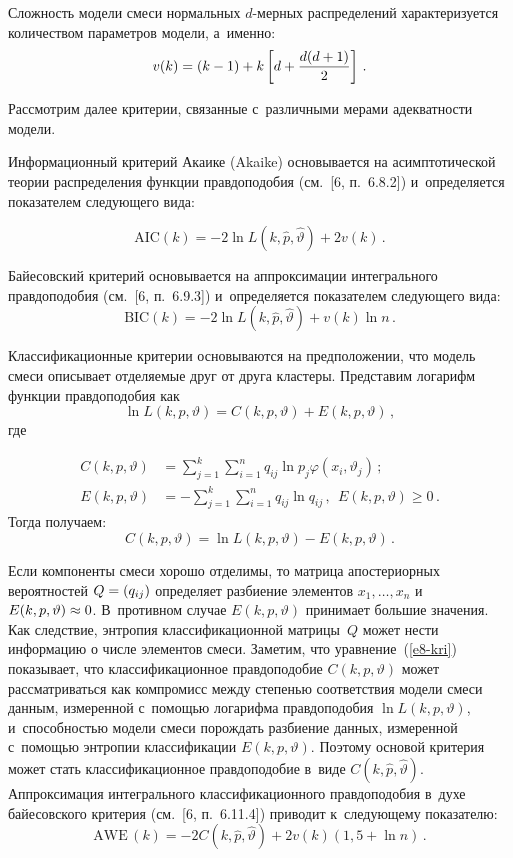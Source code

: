 \begin{multicols}{2}
     Сложность модели смеси нормальных $d$-мер\-ных распределений
характеризуется количеством параметров модели, а~именно:
     $$
     v(k) =(k-1)+k\left[ d+\displaystyle\frac{\displaystyle d(d+1)\mathstrut}{\displaystyle 2\mathstrut}\right]\,.
     $$

     Рассмотрим далее критерии, связанные с~различными мерами
адекватности модели.

\pagebreak

     Информационный критерий Акаике (Akaike) основывается на
асимптотической теории распределения функции правдоподобия (см.~[6,
п.~6.8.2]) и~определяется показателем сле\-ду\-юще\-го вида:

\noindent
     $$
     \mathrm{AIC}(k) =-2\ln L \left( k,\hat{p}, \hat{\vartheta}\right) +2v(k)\,.
     $$

     Байесовский критерий основывается на аппроксимации интегрального
правдоподобия (см.~[6, п.~6.9.3]) и~определяется показателем
следу\-юще\-го вида:
     $$
     \mathrm{BIC} (k) =-2\ln L \left( k,\hat{p},\hat{\vartheta}\right) +v(k)\ln n\,.
     $$

     Классификационные критерии основываются на предположении, что
модель смеси описывает отделяемые друг от друга кластеры. Представим
логарифм функции правдоподобия как
     $$
     \ln L\left( k,p,\vartheta\right) =C(k,p,\vartheta)+E(k,p,\vartheta)\,,
     $$
где

\vspace*{-3pt}

\noindent
\begin{align*}
C(k,p,\vartheta) &= \sum\limits_{j=1}^k \sum\limits_{i=1}^n q_{ij} \ln p_j \varphi
\left( x_i,\vartheta_j\right)\,;\\
E(k,p,\vartheta) &= -\sum\limits_{j=1}^k \sum\limits_{i=1}^n q_{ij} \ln q_{ij}\,,\
\ E(k,p,\vartheta)\geq 0\,.
\end{align*}
     Тогда получаем:
     \begin{equation}
     C(k,p,\vartheta) =\ln L(k,p,\vartheta) -E(k,p,\vartheta)\,.
     \label{e8-kri}
     \end{equation}

     Если компоненты смеси хорошо отделимы, то матрица апостериорных
вероятностей $Q\hm= (q_{ij})$ определяет разбиение элементов $x_1,\ldots ,
x_n$ и~$E(k,p,\vartheta)\hm\approx 0$. В~противном случае $E(k,p,\vartheta)$
принимает большие значения. Как следствие, энтропия классификационной
матрицы~$Q$ может нести информацию о числе элементов смеси. Заметим,
что уравнение~(\ref{e8-kri}) показывает, что классификационное правдоподобие
$C(k,p,\vartheta)$ может рассматриваться как компромисс между степенью
соответствия модели смеси данным, измеренной с~помощью логарифма
правдоподобия $\ln L (k,p,\vartheta)$, и~способностью модели смеси порождать
разбиение данных, измеренной с~помощью энтропии классификации
$E(k,p,\vartheta)$. Поэтому основой критерия может стать классификационное
правдоподобие в~виде $C(k,\hat{p},\hat{\vartheta})$. Аппроксимация
интегрального классификационного правдоподобия в~духе байесовского
критерия (см.~[6, п.~6.11.4]) приводит к~сле\-ду\-юще\-му показателю:
     $$
     \mathrm{AWE}\,(k) =-2C\left( k,\hat{p},\hat{\vartheta}\right) +2v(k) (1{,}5+\ln n)\,.
     $$


\end{multicols}
